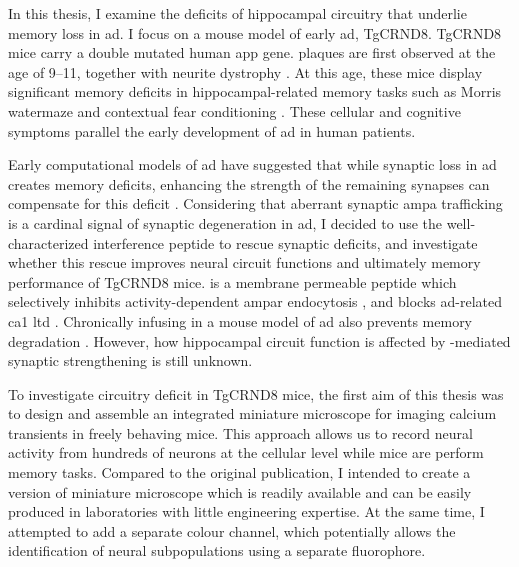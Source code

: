 In this thesis, I examine the deficits of hippocampal circuitry that underlie memory loss in \gls{ad}. I focus on a mouse model of early \gls{ad}, TgCRND8. TgCRND8 mice carry a double mutated human \gls{app} gene. \abeta{} plaques are first observed at the age of \SIrange{9}{11}{\week}, together with neurite dystrophy \citep{chishti01}. At this age, these mice display significant memory deficits in hippocampal-related memory tasks such as Morris watermaze and contextual fear conditioning \citep{hyde05, yiu11}. These cellular and cognitive symptoms parallel the early development of \gls{ad} in human patients. 

Early computational models of \gls{ad} have suggested that while synaptic loss in \gls{ad} creates memory deficits, enhancing the strength of the remaining synapses can compensate for this deficit \citep{horn93}. Considering that aberrant synaptic \gls{ampa} trafficking is a cardinal signal of synaptic degeneration in \gls{ad}, I decided to use the well-characterized interference peptide \tglu{} to rescue synaptic deficits, and investigate whether this rescue improves neural circuit functions and ultimately memory performance of TgCRND8 mice. \tglu{} is a membrane permeable peptide which selectively inhibits activity-dependent \gls{ampar} endocytosis \citep{ahmadian04}, and blocks \gls{ad}-related \gls{ca1} \gls{ltd} \citep{dong15}. Chronically infusing \tglu{} in a mouse model of \gls{ad} also prevents memory degradation \citep{dong15}. However, how hippocampal circuit function is affected by \tglu-mediated synaptic strengthening is still unknown. 

To investigate circuitry deficit in TgCRND8 mice, the first aim of this thesis was to design and assemble an integrated miniature microscope for imaging calcium transients in freely behaving mice. This approach allows us to record neural activity from hundreds of neurons at the cellular level while mice are perform memory tasks. Compared to the original \citet{ghosh11} publication, I intended to create a version of miniature microscope which is readily available and can be easily produced in laboratories with little engineering expertise. At the same time, I attempted to add a separate colour channel, which potentially allows the identification of neural subpopulations using a separate fluorophore. 

